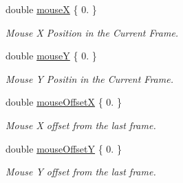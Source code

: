 \begin{DoxyCompactItemize}
double \mbox{\hyperlink{group___getters_ga68f752a9e5c04cf32a50b169df0de609}{mouseX}} \{ 0. \}
\begin{DoxyCompactList}\small\item\em Mouse X Position in the Current Frame. \end{DoxyCompactList}\item 
double \mbox{\hyperlink{group___getters_ga9f5f64a77451ba45212dab398f7b9dac}{mouseY}} \{ 0. \}
\begin{DoxyCompactList}\small\item\em Mouse Y Positin in the Current Frame. \end{DoxyCompactList}\item 
double \mbox{\hyperlink{group___getters_ga93b50aa557f493c5589af5dcc8f74c4a}{mouse\+OffsetX}} \{ 0. \}
\begin{DoxyCompactList}\small\item\em Mouse X offset from the last frame. \end{DoxyCompactList}\item 
double \mbox{\hyperlink{group___getters_ga22d84e6f9e9c7e283f303798b630c733}{mouse\+OffsetY}} \{ 0. \}
\begin{DoxyCompactList}\small\item\em Mouse Y offset from the last frame. \end{DoxyCompactList}\end{DoxyCompactItemize}
